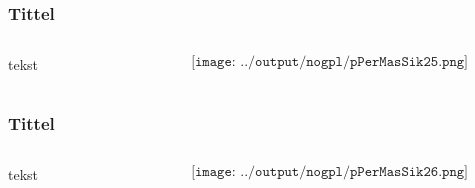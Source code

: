\documentclass[aspectratio=169,xcolor=dvipsnames]{beamer}
\begin{document}
\begin{frame}
	\frametitle{Tittel}
	\begin{columns}
		\begin{column}{0.5\textwidth}
tekst
			
		\end{column}

		\begin{column}{0.5\textwidth}
	$$\texttt{[image: ../output/nogpl/pPerMasSik25.png]}$$
		\end{column}
	\end{columns}
\end{frame}

\begin{frame}
	\frametitle{Tittel}
	\begin{columns}
		\begin{column}{0.5\textwidth}
tekst
			
		\end{column}

		\begin{column}{0.5\textwidth}
	$$\texttt{[image: ../output/nogpl/pPerMasSik26.png]}$$
		\end{column}
	\end{columns}
\end{frame}
\end{document}
